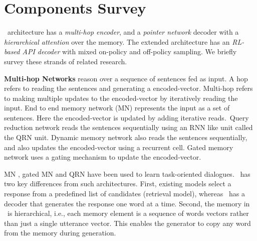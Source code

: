 
\section{Components Survey}

\sys\ architecture has a {\em multi-hop encoder}, and a {\em pointer network} decoder with a {\em hierarchical attention} over the memory. The extended architecture has an {\em RL-based API decoder} with mixed on-policy and off-policy sampling. We briefly survey these strands of related research.

\vspace{0.5ex}
\noindent
\textbf{Multi-hop Networks} reason over a sequence of sentences fed as input. A hop refers to reading the sentences and generating a encoded-vector. Multi-hop refers to making multiple updates to the encoded-vector by iteratively reading the input. End to end memory network (MN) \cite{sukhbaatar2015end} represents the input as a set of sentences. Here the encoded-vector is updated by adding iterative reads.~Query reduction network \cite{seo2016query} reads the sentences sequentially using an RNN like unit called the QRN unit. Dynamic memory network \cite{kumar2016ask} also reads the sentences sequentially, and also updates the encoded-vector using a recurrent cell. Gated memory network \cite{liu2017gated} uses a gating mechanism to update the encoded-vector. %

MN \cite{BordesW16}, gated MN and QRN have been used to learn task-oriented dialogues. \sys\ has two key differences from such architectures. First, existing models select a response from a predefined list of candidates (retrieval model), whereas \sys\ has a decoder that generates the response one word at a time. Second, the memory in \sys\ is hierarchical, i.e., each memory element is a sequence of words vectors rather than just a single utterance vector. This enables the generator to copy any word from the memory during generation.


